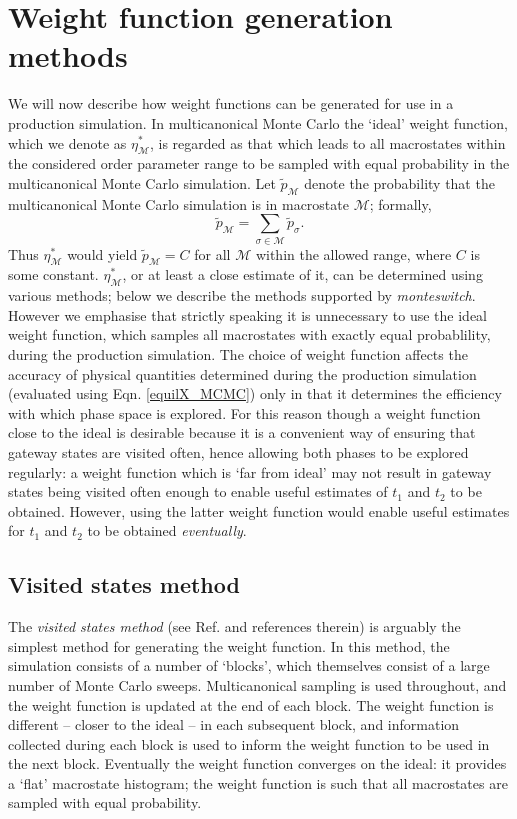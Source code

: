 \documentclass{report}
\begin{document}
\section{Weight function generation methods}\label{sec:weight_generation}
We will now describe how weight functions can be generated for use in a production simulation.
In multicanonical Monte Carlo the `ideal' weight function, which we denote as $\eta_{\mathcal{M}}^*$, is regarded as that which leads to 
all macrostates within the considered order parameter range to be sampled with equal probability in the multicanonical Monte Carlo simulation.
Let $\tilde{p}_{\mathcal{M}}$ denote the probability that the multicanonical Monte Carlo simulation is in macrostate $\mathcal{M}$; formally,
\begin{equation}
\tilde{p}_{\mathcal{M}}=\sum_{\sigma\in\mathcal{M}}\tilde{p}_{\sigma}.
\end{equation}
Thus $\eta_{\mathcal{M}}^*$ would yield $\tilde{p}_{\mathcal{M}}=C$ for all $\mathcal{M}$ within the allowed range, where $C$ is some constant.
$\eta^*_{\mathcal{M}}$, or at least a close estimate of it, can be determined using various methods; below we 
describe the methods supported by \emph{monteswitch}. 
However we emphasise that strictly speaking it is unnecessary to use the ideal weight function, which samples all macrostates with exactly equal 
probablility, during the
production simulation. The choice of weight function affects the accuracy of physical quantities determined during the production simulation
(evaluated using Eqn. \eqref{equilX_MCMC}) only in that it determines the efficiency with which phase space is explored. For this reason though a
weight function close to the ideal is desirable because it is a convenient way of ensuring that gateway states are visited often, hence 
allowing both phases to be explored regularly: a weight function which is `far from ideal' may not result in gateway states being visited often
enough to enable useful estimates of $t_1$ and $t_2$ to be obtained. However, using the latter weight function would enable useful estimates 
for $t_1$ and $t_2$ to be obtained \emph{eventually}.

\subsection{Visited states method}\label{sec:visited_states}
The \emph{visited states method} (see Ref. \cite{Smith_1995} and references therein) is arguably the simplest method for generating the weight function. 
In this method, the simulation consists of a number of
`blocks', which themselves consist of a large number of Monte Carlo sweeps. Multicanonical sampling is used throughout, and the weight function is updated at
the end of each block. The weight function is different -- closer to the ideal -- in each subsequent block, and information
collected during each block is used to inform the weight function to be used in the next block. Eventually the weight function converges on the 
ideal: it provides a `flat' macrostate histogram; the weight function is such that all macrostates are sampled with equal probability.
\end{document}
